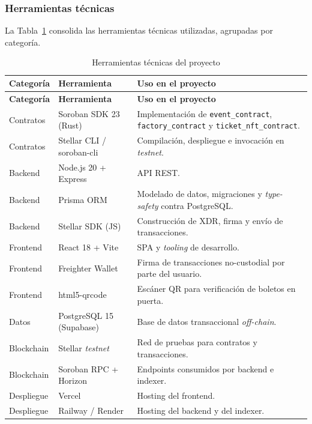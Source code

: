 \documentclass[12pt,oneside]{report}
\begin{document}
      \subsubsection{Herramientas técnicas}
      La Tabla~\ref{tab:herramientas-tecnicas} consolida las herramientas técnicas utilizadas, agrupadas por categoría.

      \begin{longtable}{@{}p{3.3cm} p{4.0cm} p{7.5cm}@{}}
        \caption{Herramientas técnicas del proyecto}
        \label{tab:herramientas-tecnicas}\\
        \toprule
        \textbf{Categoría} & \textbf{Herramienta} & \textbf{Uso en el proyecto}\\
        \midrule
        \endfirsthead
        \toprule
        \textbf{Categoría} & \textbf{Herramienta} & \textbf{Uso en el proyecto}\\
        \midrule
        \endhead
        \bottomrule
        \endfoot
        Contratos & Soroban SDK 23 (Rust) & Implementación de \texttt{event\_contract}, \texttt{factory\_contract} y \texttt{ticket\_nft\_contract}.\\
        Contratos & Stellar CLI / soroban-cli & Compilación, despliegue e invocación en \textit{testnet}.\\
        Backend & Node.js 20 + Express & API REST.\\
        Backend & Prisma ORM & Modelado de datos, migraciones y \textit{type-safety} contra PostgreSQL.\\
        Backend & Stellar SDK (JS) & Construcción de XDR, firma y envío de transacciones.\\
        Frontend & React 18 + Vite & SPA y \textit{tooling} de desarrollo.\\
        Frontend & Freighter Wallet & Firma de transacciones no-custodial por parte del usuario.\\
        Frontend & html5-qrcode & Escáner QR para verificación de boletos en puerta.\\
        Datos & PostgreSQL 15 (Supabase) & Base de datos transaccional \textit{off-chain}.\\
        Blockchain & Stellar \textit{testnet} & Red de pruebas para contratos y transacciones.\\
        Blockchain & Soroban RPC + Horizon & Endpoints consumidos por backend e indexer.\\
        Despliegue & Vercel & Hosting del frontend.\\
        Despliegue & Railway / Render & Hosting del backend y del indexer.\\

\end{longtable}
\end{document}
